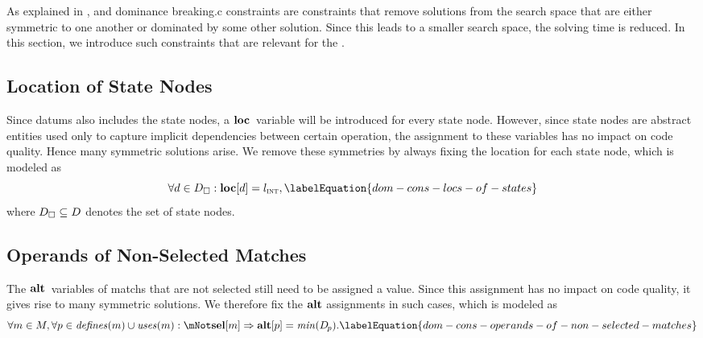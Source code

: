As explained in ,  and \gls{dominance breaking.c} \glspl{constraint} are
\glspl{constraint} that remove \glspl{solution} from the \gls{search space} that
are either symmetric to one another or dominated by some other \gls{solution}.
%
Since this leads to a smaller \gls{search space}, the solving time is reduced.
%
In this section, we introduce such \glspl{constraint} that are relevant for the
.


\subsection{Location of State Nodes}

Since \glspl{datum} also includes the \glspl{state node}, a
$\mVar{loc}$~\gls{variable} will be introduced for every \gls{state node}.
%
However, since \glspl{state node} are abstract entities used only to capture
implicit dependencies between certain \gls{operation}, the assignment to these
\glspl{variable} has no impact on code quality.
%
Hence many symmetric \glspl{solution} arise.
%
We remove these symmetries by always fixing the \gls{location} for each
\gls{state node}, which is modeled as
%
\begin{equation}
  \forall d \in \mStateDataSet :
  \mVar{loc}[d] = \mIntLocation,
  \labelEquation{dom-cons-locs-of-states}
\end{equation}
%
where \mbox{$\mStateDataSet \subseteq \mDataSet$} denotes the set of
\glspl{state node}.


\subsection{Operands of Non-Selected Matches}

The $\mVar{alt}$~\glspl{variable} of \glspl{match} that are not selected still
need to be assigned a value.
%
Since this assignment has no impact on code quality, it gives rise to many
symmetric \glspl{solution}.
%
We therefore fix the $\mVar{alt}$ assignments in such cases, which is modeled as
%
\begin{equation}
  \forall m \in \mMatchSet,
  \forall p \in \mDefines(m) \cup \mUses(m) :
  \mNot\mVar{sel}[m] \mImp \mVar{alt}[p] = \mMin(\mDataSet[\hspace{-1pt}p]).
  \labelEquation{dom-cons-operands-of-non-selected-matches}
\end{equation}

